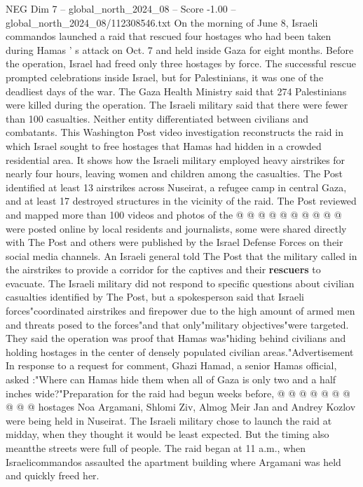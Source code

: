 \begin{textsample}{NEG Dim 7 – global\_north\_2024\_08 – Score -1.00 – global\_north\_2024\_08/112308546.txt}  \label{ex:f7_neg_444}
On the morning of June 8, Israeli commandos launched a raid that rescued four hostages who had been taken during Hamas ' s attack on Oct. 7 and held inside Gaza for eight months.
Before the operation, Israel had freed only three hostages by force.
The successful rescue prompted celebrations inside Israel, but for Palestinians, it was one of the deadliest days of the war.
The Gaza Health Ministry said that 274 Palestinians were killed during the operation.
The Israeli military said that there were fewer than 100 casualties.
Neither entity differentiated between civilians and combatants.
This Washington Post video investigation reconstructs the raid in which Israel sought to free hostages that Hamas had hidden in a crowded residential area.
It shows how the Israeli military employed heavy airstrikes for nearly four hours, leaving women and children among the casualties.
The Post identified at least 13 airstrikes across Nuseirat, a refugee camp in central Gaza, and at least 17 destroyed structures in the vicinity of the raid.
The Post reviewed and mapped more than 100 videos and photos of the @ @ @ @ @ @ @ @ @ @ were posted online by local residents and journalists, some were shared directly with The Post and others were published by the Israel Defense Forces on their social media channels.
An Israeli general told The Post that the military called in the airstrikes to provide a corridor for the captives and their \textbf{rescuers} to evacuate.
The Israeli military did not respond to specific questions about civilian casualties identified by The Post, but a spokesperson said that Israeli forces"coordinated airstrikes and firepower due to the high amount of armed men and threats posed to the forces"and that only"military objectives"were targeted.
They said the operation was proof that Hamas was"hiding behind civilians and holding hostages in the center of densely populated civilian areas."Advertisement In response to a request for comment, Ghazi Hamad, a senior Hamas official, asked :"Where can Hamas hide them when all of Gaza is only two and a half inches wide?"Preparation for the raid had begun weeks before, @ @ @ @ @ @ @ @ @ @ hostages Noa Argamani, Shlomi Ziv, Almog Meir Jan and Andrey Kozlov were being held in Nuseirat.
The Israeli military chose to launch the raid at midday, when they thought it would be least expected.
But the timing also meantthe streets were full of people.
The raid began at 11 a.m., when Israelicommandos assaulted the apartment building where Argamani was held and quickly freed her.

\end{textsample}

